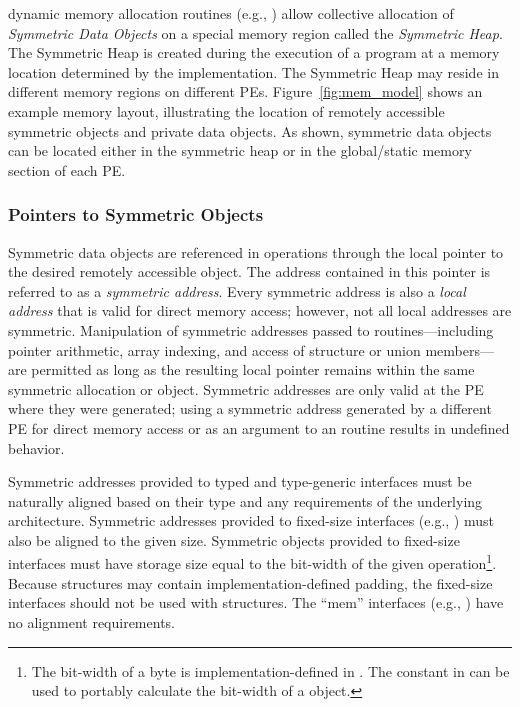 \openshmem dynamic memory allocation routines (e.g.,
) allow collective allocation of \emph{Symmetric Data
Objects} on a special memory region called the \emph{Symmetric Heap}. The
Symmetric Heap is created during the execution of a program at a memory location
determined by the implementation. The Symmetric Heap may reside in different
memory regions on different \acp{PE}.
Figure~\ref{fig:mem_model} shows an example \openshmem
memory layout, illustrating the location of remotely accessible symmetric
objects and private data objects.  As shown, symmetric data objects can be
located either in the symmetric heap or in the global/static memory section of
each \ac{PE}.

\subsubsection{Pointers to Symmetric Objects}\label{subsec:pointers_to_symmetric_objects}

Symmetric data objects are referenced in \openshmem operations through the
local pointer to the desired remotely accessible object.  The address contained
in this pointer is referred to as a {\em symmetric address}.  Every symmetric
address is also a {\em local address} that is valid for direct memory access;
however, not all local addresses are symmetric.  Manipulation of symmetric
addresses passed to \openshmem routines---including pointer arithmetic,
array indexing, and access of structure or union members---are permitted as long as
the resulting local pointer remains within the same symmetric allocation or
object.  Symmetric addresses are only valid at the \ac{PE} where they were
generated; using a symmetric address generated by a different \ac{PE} for
direct memory access or as an argument to an \openshmem routine results
in undefined behavior.

Symmetric addresses provided to typed and type-generic \openshmem interfaces
must be naturally aligned based on their type and any requirements of the
underlying architecture.  Symmetric addresses provided to fixed-size \openshmem
interfaces (e.g., ) must also be aligned to the given
size.  Symmetric objects provided to fixed-size \openshmem interfaces
must have storage size equal to the bit-width of the given
operation\footnote{The bit-width of a byte is implementation-defined in \Cstd.  The
 constant in  can be used to portably
calculate the bit-width of a \Cstd object.}.  Because \CorCpp{} structures may
contain implementation-defined padding, the fixed-size interfaces should not be
used with \CorCpp{} structures.
The ``mem'' interfaces (e.g., ) have no alignment
requirements.

